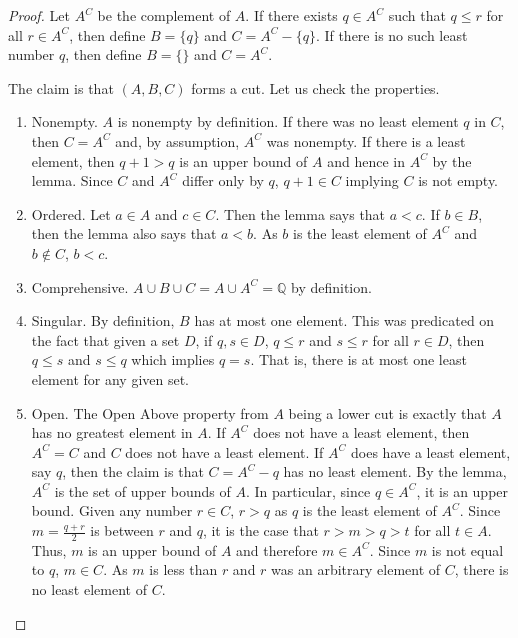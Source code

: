 \documentclass{rmj-public}
\begin{document}
\begin{proof}
    Let $A^C$ be the complement of $A$. If there exists $q \in A^C$ such that $q \leq r$ for all $r \in A^C$, then define $B = \{q\}$ and $C = A^C - \{q\}$. If there is no such least number $q$, then define $B = \{\}$ and $C = A^C$. 

    The claim is that $(A, B, C)$ forms a cut. Let us check the properties. 

    \begin{enumerate}
        \item Nonempty. $A$ is nonempty by definition. If there was no least element $q$ in $C$, then $C = A^C$ and, by assumption, $A^C$ was nonempty. If there is a least element, then $q+1 > q$ is an upper bound of $A$ and hence in $A^C$ by the lemma. Since $C$ and $A^C$ differ only by $q$, $q+1 \in C$ implying $C$ is not empty. 
        \item Ordered. Let $a \in A$ and $c \in C$. Then the lemma says that $ a< c$. If $b \in B$, then the lemma also says that $a < b$. As $b$ is the least element of $A^C$ and $b \notin C$, $ b < c$. 
        \item Comprehensive. $A \cup B \cup C = A \cup A^C = \mathbb{Q}$ by definition. 
        \item Singular. By definition, $B$ has at most one element. This was predicated on the fact that given a set $D$, if $q, s \in D$, $q \leq r$ and $s \leq r$ for all $r \in D$, then $q \leq s$ and $s \leq q$ which implies $q = s$. That is, there is at most one least element for any given set. 
        \item Open. The Open Above property from $A$ being a lower cut is exactly that $A$ has no greatest element in $A$. If $A^C$ does not have a least element, then $A^C = C$ and $C$ does not have a least element. If $A^C$ does have a least element, say $q$, then the claim is that $C= A^C - {q}$ has no least element. By the lemma, $A^C$ is the set of upper bounds of $A$. In particular, since $q \in A^C$, it is an upper bound. Given any number $r \in C$, $r > q$ as $q$ is the least element of $A^C$. Since $m = \frac{q+r}{2}$ is between $r$ and $q$, it is the case that $r > m > q > t$ for all $t \in A$. Thus, $m$ is an upper bound of $A$ and therefore $m \in A^C$. Since $m$ is not equal to $q$, $m \in C$. As $m$ is less than $r$ and $r$ was an arbitrary element of $C$, there is no least element of $C$. 
    \end{enumerate}
\end{proof}
\end{document}

